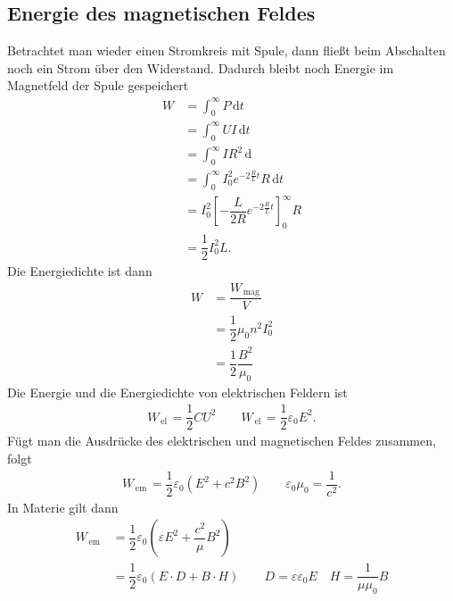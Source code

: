 \documentclass[a4paper,12pt]{article}
\newcommand{\td}{\,\text{d}}
\begin{document}
\subsection{Energie des magnetischen Feldes}
Betrachtet man wieder einen Stromkreis mit Spule, dann fließt beim Abschalten noch ein Strom über den Widerstand. Dadurch bleibt noch Energie im Magnetfeld der Spule gespeichert
\begin{align*} 
        W&=\int_{0}^{\infty}P\td t\\
         &=\int_{0}^{\infty}UI\td t\\
         &=\int_{0}^{\infty}IR^2\td \\
         &=\int_{0}^{\infty}I_0^2e ^{-2 \tfrac{R}{L}t}R\td t\\
         &=I_0^2\left[-\dfrac{L}{2R}e ^{-2 \tfrac{R}{L}t}\right]_0^\infty R\\
         &=\dfrac{1}{2}I_0^2L
.\end{align*} 
Die Energiedichte ist dann
\begin{align*} 
        W&=\dfrac{W_{\,\text{mag}\,}}{V}\\
         &=\dfrac{1}{2}\mu _0n^2I_0^2\\
         &=\dfrac{1}{2}\dfrac{B^2}{\mu _0}
\end{align*} 
Die Energie und die Energiedichte von elektrischen Feldern ist
\begin{align*} 
        W_{\,\text{el}\,}=\dfrac{1}{2}CU^2\qquad W_{\,\text{el}\,}=\dfrac{1}{2}\varepsilon _0E^2
.\end{align*} 
Fügt man die Ausdrücke des elektrischen und magnetischen Feldes zusammen, folgt
\begin{align*} 
        W_{\,\text{em}\,}=\dfrac{1}{2}\varepsilon _0\left(E^2+c^2B^2\right)\qquad \varepsilon _0\mu _0=\dfrac{1}{c^2}
.\end{align*} 
In Materie gilt dann
\begin{align*} 
        W_{\,\text{em}\,}&=\dfrac{1}{2}\varepsilon _0\left(\varepsilon E^2+\dfrac{c^2}{\mu }B^2\right)\\
                         &=\dfrac{1}{2}\varepsilon _0\left(E\cdot D+B\cdot H\right)\qquad D=\varepsilon \varepsilon _0E\quad H=\dfrac{1}{\mu \mu _0}B
\end{align*} 
\end{document}
